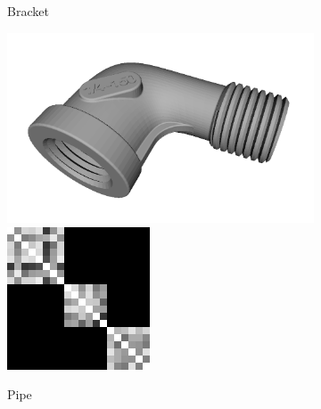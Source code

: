 \begin{figure}[ht]
\begin{subfigure}[b]{0.23\linewidth}
		\caption{Bracket}
	\end{subfigure}
	\begin{subfigure}[b]{0.23\linewidth}
		\includegraphics[width=\linewidth]{fig/3dreg/pipe.png} \\
		\includegraphics[width=\linewidth]{fig/3dreg/reg3Dtrain_pipe.png} 
		\caption{Pipe}
	\end{subfigure}
	\begin{subfigure}[b]{0.23\linewidth}

\end{subfigure}
\end{figure}
